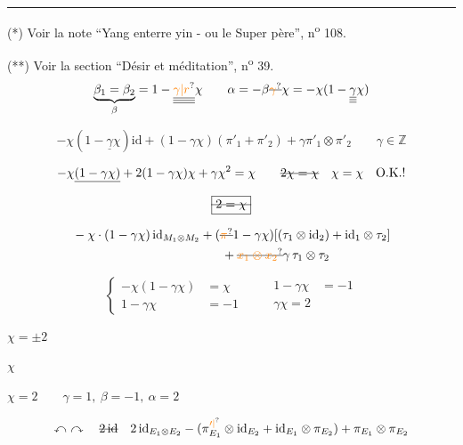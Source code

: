 \noindent\rule{5em}{0.3pt}\par
(*) Voir la note ``Yang enterre yin - ou le Super père'', n\textsuperscript{o} 108.

(**) Voir la section ``Désir et méditation'', n\textsuperscript{o} 39.
\[
\underbrace{\beta_1=\beta_2}_{\beta}=1-\underline{\underline{\underline{\unsure{\gamma|r}}}}\chi
\qquad \alpha=-\beta\deleted{\unsure{\gamma}}\chi=-\chi(1-\underline{\underline{\underline{\gamma}}}\chi)
\]

\[
-\chi(1-\underline{\gamma}\chi)\mathrm{id}+(1-\gamma\chi)(\pi'_1+\pi'_2)+\gamma\pi'_1\otimes\pi'_2
\qquad\gamma\in\mathbb Z
\]

\[
-\chi\underline{(1-\gamma\chi)}+2(1-\gamma\chi)\chi+\gamma\chi^2=\chi
\qquad\deleted{2\chi=\chi}\quad\chi=\chi\quad\text{O.K.!}
\]

\[\deleted{\boxed{2=\chi}}\]

\[
\begin{aligned}
&-\chi\cdot(1-\gamma\chi)\,\mathrm{id}_{M_1\otimes M_2}
+(\deleted{\unsure{\pi}}1-\gamma\chi)[(\tau_1\otimes\mathrm{id}_2)+\mathrm{id}_1\otimes\tau_2]\\
&\hspace{12em}+\deleted{\unsure{x_1\otimes x_2}}\gamma\,\tau_1\otimes\tau_2
\end{aligned}
\]

\[
\left\{\begin{aligned}-\chi(1-\gamma\chi)&=\chi\\1-\gamma\chi&=-1\end{aligned}\right.
\qquad
\begin{aligned}1-\gamma\chi&=-1\\\boxed{\gamma\chi=2}\end{aligned}
\]

 $\chi=\pm2$

 $\chi$ \deleted{$\unsure{\chi}$}

$\chi=2\qquad\gamma=1,\ \beta=-1,\ \alpha=2$ 

\[
\curvearrowleft\ \curvearrowright\quad\deleted{2\,\mathrm{id}}\quad
2\,\mathrm{id}_{E_1\otimes E_2}-
(\pi_{E_1}^{\unsure{\prime|}}\otimes\mathrm{id}_{E_2}+\mathrm{id}_{E_1}\otimes\pi_{E_2})
+\pi_{E_1}\otimes\pi_{E_2}
\]

